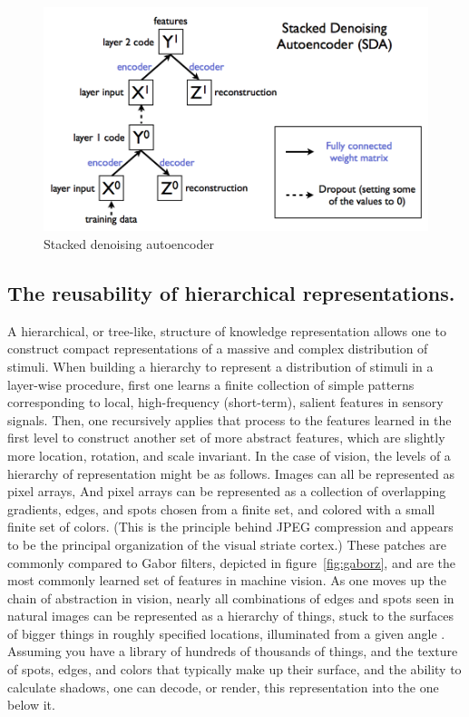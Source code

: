 \documentclass[12pt]{article}
\begin{document}
\begin{doublespacing}
\begin{figure}[p]
\centering
\includegraphics[width=6in]{key1001}  
\caption{Stacked denoising autoencoder}
\label{fig:sda_struct}
\end{figure}
		
	\subsection{The reusability of hierarchical representations.}
	A hierarchical, or tree-like, structure of knowledge representation allows one to construct compact representations of a massive and complex distribution of stimuli. When building a hierarchy to represent a distribution of stimuli in a layer-wise procedure, first one learns a finite collection of simple patterns corresponding to local, high-frequency (short-term), salient features in sensory signals. Then, one recursively applies that process to the features learned in the first level to construct another set of more abstract features, which are slightly more location, rotation, and scale invariant. In the case of vision, the levels of a hierarchy of representation might be as follows. Images can all be represented as pixel arrays, And pixel arrays can be represented as a collection of overlapping gradients, edges, and spots chosen from a finite set, and colored with a small finite set of colors. (This is the principle behind JPEG compression and appears to be the principal organization of the visual striate cortex.\cite{daugman1980two}) These patches are commonly compared to Gabor filters, depicted in figure~\ref{fig:gaborz}\cite{daugman1988complete, jain1991unsupervised}, and are the most commonly learned set of features in machine vision. As one moves up the chain of abstraction in vision, nearly all combinations of edges and spots seen in natural images can be represented as a hierarchy of things, stuck to the surfaces of bigger things in roughly specified locations, illuminated from a given angle \cite{gluckman2003kurtosis}. Assuming you have a library of hundreds of thousands of things, and the texture of spots, edges, and colors that typically make up their surface, and the ability to calculate shadows, one can decode, or render, this representation into the one below it.


\end{doublespacing}
\end{document}
